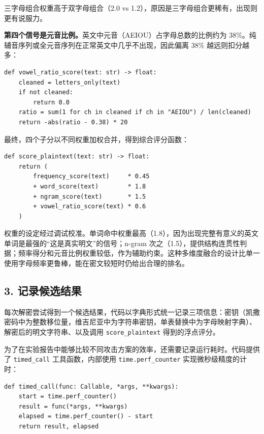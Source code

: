 \documentclass[12pt, a4paper]{article}
\begin{document}
三字母组合权重高于双字母组合（2.0 vs 1.2），原因是三字母组合更稀有，出现则更有说服力。

\textbf{第四个信号是元音比例。}英文中元音（AEIOU）占字母总数的比例约为 38\%。纯辅音序列或全元音序列在正常英文中几乎不出现，因此偏离 38\% 越远则扣分越多：

\begin{lstlisting}[style=python, caption={元音比例评分函数（common.py）}]
def vowel_ratio_score(text: str) -> float:
    cleaned = letters_only(text)
    if not cleaned:
        return 0.0
    ratio = sum(1 for ch in cleaned if ch in "AEIOU") / len(cleaned)
    return -abs(ratio - 0.38) * 20
\end{lstlisting}

最终，四个子分以不同权重加权合并，得到综合评分函数：

\begin{lstlisting}[style=python, caption={综合评分函数（common.py）}]
def score_plaintext(text: str) -> float:
    return (
        frequency_score(text)     * 0.45
        + word_score(text)        * 1.8
        + ngram_score(text)       * 1.5
        + vowel_ratio_score(text) * 0.6
    )
\end{lstlisting}

权重的设定经过调试校准。单词命中权重最高（1.8），因为出现完整有意义的英文单词是最强的``这是真实明文''的信号；n-gram 次之（1.5），提供结构连贯性判据；频率得分和元音比例权重较低，作为辅助约束。这种多维度融合的设计比单一使用字母频率更鲁棒，能在密文较短时仍给出合理的排名。

\subsection{3. 记录候选结果}

每次解密尝试得到一个候选结果，代码以字典形式统一记录三项信息：密钥（凯撒密码中为整数移位量，维吉尼亚中为字符串密钥，单表替换中为字母映射字典）、解密后的明文字符串、以及调用 \texttt{score\_plaintext} 得到的浮点评分。

为了在实验报告中能够比较不同攻击方案的效率，还需要记录运行耗时。代码提供了 \texttt{timed\_call} 工具函数，内部使用 \texttt{time.perf\_counter} 实现微秒级精度的计时：

\begin{lstlisting}[style=python, caption={计时工具函数（common.py）}]
def timed_call(func: Callable, *args, **kwargs):
    start = time.perf_counter()
    result = func(*args, **kwargs)
    elapsed = time.perf_counter() - start
    return result, elapsed
\end{lstlisting}
\end{document}

